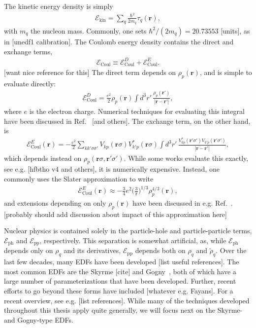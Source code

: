\documentclass[../thesis.tex]{subfiles}
\begin{document}
The kinetic energy density is simply
\begin{align}
	\mathcal{E}_\textrm{kin}=\sum_q\frac{\hbar^2}{2m_q}\tau_q(\bm{r}),
\end{align}
with $m_q$ the nucleon mass. Commonly, one sets $\hbar^2/(2m_q)=20.73553$ [units], as in [unedf1 calibration]. The Coulomb energy density contains the direct and exchange terms,
\begin{align}
	\mathcal{E}_\textrm{Coul}\equiv \mathcal{E}_\textrm{Coul}^D+\mathcal{E}_\textrm{Coul}^E.
\end{align}
[want nice reference for this] The direct term depends on $\rho_p(\bm{r})$, and is simple to evaluate directly:
\begin{align}
	\mathcal{E}_\textrm{Coul}^D=\frac{e^2}{2}\rho_p(\bm{r})\int d^3r'\,\frac{\rho_p(\bm{r}')}{|\bm{r}-\bm{r}'|},
\end{align}
where $e$ is the electron charge. Numerical techniques for evaluating this integral have been discussed in Ref.~\cite{Stoitsov2005} [and others]. The exchange term, on the other hand, is~\cite{Slater1951}
\begin{align}
	\mathcal{E}_\textrm{Coul}^E(\bm{r})=-\frac{e^2}{2}\sum_{kk'\sigma\sigma'}V_{kp}(\bm{r}\sigma)V_{k'p}^*(\bm{r}\sigma)\int d^3r'\,\frac{V_{kp}^*(\bm{r}'\sigma')V_{k'p}(\bm{r}'\sigma')}{|\bm{r}-\bm{r}'|},
\end{align}
which depends instead on $\rho_p(\bm{r}\sigma,\bm{r}'\sigma')$. While some works evaluate this exactly, see e.g. [hfbtho v4 and others], it is numerically expensive.  Instead, one commonly uses the Slater approximation to write
\begin{align}
	\mathcal{E}_\textrm{Coul}^E(\bm{r})\approx -\frac{3}{4}e^2\bigg(\frac{3}{\pi}\bigg)^{1/3}\rho_p^{4/3}(\bm{r}),
\end{align}
and extensions depending on only $\rho_p(\bm{r})$ have been discussed in e.g. Ref.~\cite{Naito2019}. [probably should add discussion about impact of this approximation here]

Nuclear physics is contained solely in the particle-hole and particle-particle terms, $\mathcal{E}_\textrm{ph}$ and $\mathcal{E}_\textrm{pp}$, respectively. This separation is somewhat artificial, as, while $\mathcal{E}_\textrm{ph}$ depends only on $\rho_q$ and its derivatives, $\mathcal{E}_\textrm{pp}$ depends both on $\rho_q$ and $\tilde{\rho}_q$. Over the last few decades, many EDFs have been developed [list useful references]. The most common EDFs are the Skyrme [cite] and Gogny~\cite{Decharg_e1980}, both of which have a large number of parameterizations that have been developed. Further, recent efforts to go beyond these forms have included [whatever e.g. Fayans]. For a recent overview, see e.g. [list references]. While many of the techniques developed throughout this thesis apply quite generally, we will focus next on the Skyrme- and Gogny-type EDFs.
\end{document}
